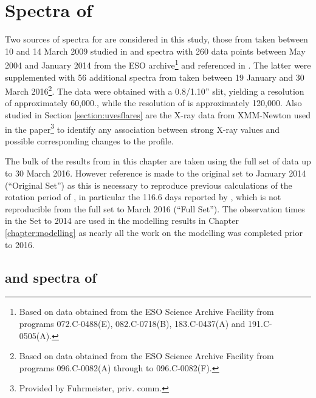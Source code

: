 \chapter{Spectra of \prox}
\protect\label{chapter:proxima}

Two sources of spectra for {\prox} are considered in this study, those from {\uves} taken between 10 and 14 March 2009
studied in \citet{fuhrmeister11} and {\harps} spectra with 260 data points between May 2004 and January 2014 from the
ESO archive\footnote{Based on data obtained from the ESO Science Archive Facility from programs 072.C-0488(E),
  082.C-0718(B), 183.C-0437(A) and 191.C-0505(A).} and referenced in \citet[Table 3]{suarezmascareno15}. The latter were
supplemented with 56 additional spectra from {\harps} taken between 19 January and 30 March 2016\footnote{Based on data obtained
  from the ESO Science Archive Facility from programs 096.C-0082(A) through to 096.C-0082(F).}. The {\uves} data were
obtained with a 0.8/1.10'' slit, yielding a resolution of approximately 60,000., while the resolution of {\harps} is
approximately 120,000. Also studied in Section \ref{section:uvesflares} are the X-ray data from XMM-Newton used in the
\citet{fuhrmeister11} paper\footnote{Provided by Fuhrmeister, priv. comm.} to identify any association between strong
X-ray values and possible corresponding changes to the {\ha} profile.

The bulk of the results from {\harps} in this chapter are taken using the full set of data up to 30 March 2016. However
reference is made to the original set to January 2014 (``Original Set'') as this is necessary to reproduce previous
calculations of the rotation period of \prox, in particular the 116.6 days reported by \citet[Table
3]{suarezmascareno15}, which is not reproducible from the full set to March 2016 (``Full Set''). The observation times
in the Set to 2014 are used in the modelling results in Chapter \ref{chapter:modelling} as nearly all the work on the
modelling was completed prior to 2016.

\section{{\harps} and {\uves} spectra of \prox}

